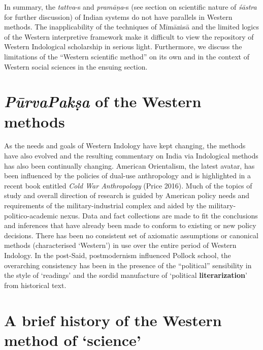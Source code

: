 In summary, the {\sl tattva}-s and {\sl pramāṇa}-s (see section on scientific nature of {\sl śāstra} for further discussion) of Indian systems do not have parallels in Western methods. The inapplicability of the techniques of Mīmāṁsā and the limited logics of the Western interpretive framework make it difficult to view the repository of Western Indological scholarship in serious light. Furthermore, we discuss the limitations of the ``Western scientific method'' on its own and in the context of Western social sciences in the ensuing section.

\section*{{{\sl\bfseries PūrvaPakṣa}\relax} of the Western methods}

As the needs and goals of Western Indology have kept changing, the methods have also evolved and the resulting commentary on India via Indological methods has also been continually changing. American Orientalism, the latest avatar, has been influenced by the policies of dual-use anthropology and is highlighted in a recent book entitled {\sl Cold War Anthropology} (Price 2016). Much of the topics of study and overall direction of research is guided by American policy needs and requirements of the military-industrial complex and aided by the military-politico-academic nexus. Data and fact collections are made to fit the conclusions and inferences that have already been made to conform to existing or new policy decisions. There has been no consistent set of axiomatic assumptions or canonical methods (characterised `Western') in use over the entire period of Western Indology. In the post-Said, postmodernism influenced Pollock school, the overarching consistency has been in the presence of the ``political'' sensibility in the style of `readings' and the sordid manufacture of `political {\bf literarization}' from historical text.

\newpage

\section*{A brief history of the Western method of `science'}

